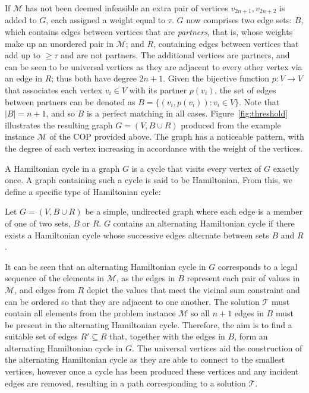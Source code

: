 \documentclass[authoryear]{elsarticle}
\begin{document}
If $\mathcal{M}$ has not been deemed infeasible an extra pair of vertices $v_{2n+1}, v_{2n+2}$ is added to $G$, each assigned a weight equal to $\tau$. $G$ now comprises two edge sets: $B$, which contains edges between vertices that are \emph{partners}, that is, whose weights make up an unordered pair in $\mathcal{M}$; and $R$, containing edges between vertices that add up to $\geq \tau$ and are not partners. The additional vertices are partners, and can be seen to be universal vertices as they are adjacent to every other vertex via an edge in $R$; thus both have degree $2n+1$. Given the bijective function $p : V \to V$ that associates each vertex $v_i \in V$ with its partner $p(v_i)$, the set of edges between partners can be denoted as $B = \{(v_i, p(v_i)) : v_i \in V\}$. Note that $|B| = n+1$, and so $B$ is a perfect matching in all cases. Figure~\ref{fig:threshold} illustrates the resulting graph $G = (V, B \cup R)$ produced from the example instance $\mathcal{M}$ of the COP provided above. The graph has a noticeable pattern, with the degree of each vertex increasing in accordance with the weight of the vertices.

A Hamiltonian cycle in a graph $G$ is a cycle that visits every vertex of $G$ exactly once. A graph containing such a cycle is said to be Hamiltonian. From this, we define a specific type of Hamiltonian cycle:

\begin{definition} %
	\label{defn:althamcycle}
	Let $G = (V, B \cup R)$ be a simple, undirected graph where each edge is a member of one of two sets, $B$ or $R$. $G$ contains an alternating Hamiltonian cycle if there exists a Hamiltonian cycle whose successive edges alternate between sets $B$ and $R$.
\end{definition}

\noindent It can be seen that an alternating Hamiltonian cycle in $G$ corresponds to a legal sequence of the elements in $\mathcal{M}$, as the edges in $B$ represent each pair of values in $\mathcal{M}$, and edges from $R$ depict the values that meet the vicinal sum constraint and can be ordered so that they are adjacent to one another. The solution $\mathcal{T}$ must contain all elements from the problem instance $\mathcal{M}$ so all $n+1$ edges in $B$ must be present in the alternating Hamiltonian cycle. Therefore, the aim is to find a suitable set of edges $R' \subseteq R$ that, together with the edges in $B$, form an alternating Hamiltonian cycle in $G$. The universal vertices aid the construction of the alternating Hamiltonian cycle as they are able to connect to the smallest vertices, however once a cycle has been produced these vertices and any incident edges are removed, resulting in a path corresponding to a solution $\mathcal{T}$.
\end{document}
